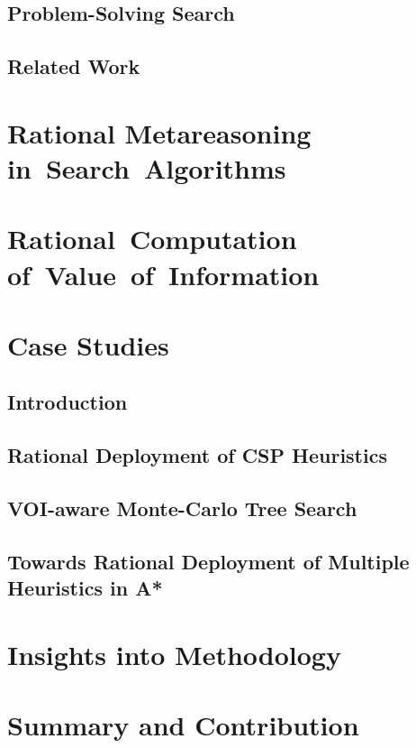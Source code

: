 \documentclass[oneside]{report}
\begin{document}
\section{Problem-Solving Search}
\label{sec:search}


\section{Related Work}
\label{sec:related}


\chapter{Rational Metareasoning in~Search~Algorithms}
\label{ch:ramesrch}


\chapter{Rational~Computation of~Value~of~Information}
\label{ch:raticomp}


\chapter{Case Studies}
\label{ch:case-studies}
\section{Introduction}
\label{sec:cs-intro}


\clearpage
\section{Rational Deployment of CSP Heuristics}
\label{sec:cs-csp}


\clearpage
\section{VOI-aware Monte-Carlo Tree Search}
\label{sec:cs-mcts}


\clearpage
\section{Towards Rational Deployment of Multiple Heuristics in A*}
\label{sec:cs-rla}


\clearpage
\chapter{Insights into Methodology}
\label{ch:insights}


\chapter {Summary and Contribution}
\label{ch:summary}




\end{document}
